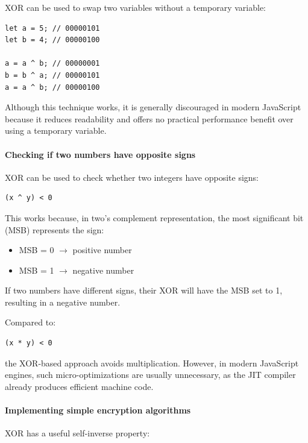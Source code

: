 \documentclass{scrbook}
\begin{document}
XOR can be used to swap two variables without a temporary variable:

\begin{lstlisting}
let a = 5; // 00000101
let b = 4; // 00000100

a = a ^ b; // 00000001
b = b ^ a; // 00000101
a = a ^ b; // 00000100
\end{lstlisting}

Although this technique works, it is generally discouraged in modern JavaScript because it reduces readability and offers no practical performance benefit over using a temporary variable.

\paragraph{Checking if two numbers have opposite signs}

XOR can be used to check whether two integers have opposite signs:

\begin{lstlisting}
(x ^ y) < 0
\end{lstlisting}

This works because, in two's complement representation, the most significant bit (MSB) represents the sign:
\begin{itemize}
    \item MSB = 0 $\rightarrow$ positive number
    \item MSB = 1 $\rightarrow$ negative number
\end{itemize}

If two numbers have different signs, their XOR will have the MSB set to 1, resulting in a negative number.

\medskip

Compared to:

\begin{lstlisting}
(x * y) < 0
\end{lstlisting}

the XOR-based approach avoids multiplication. However, in modern JavaScript engines, such micro-optimizations are usually unnecessary, as the JIT compiler already produces efficient machine code.

\paragraph{Implementing simple encryption algorithms}

XOR has a useful self-inverse property:
\end{document}
